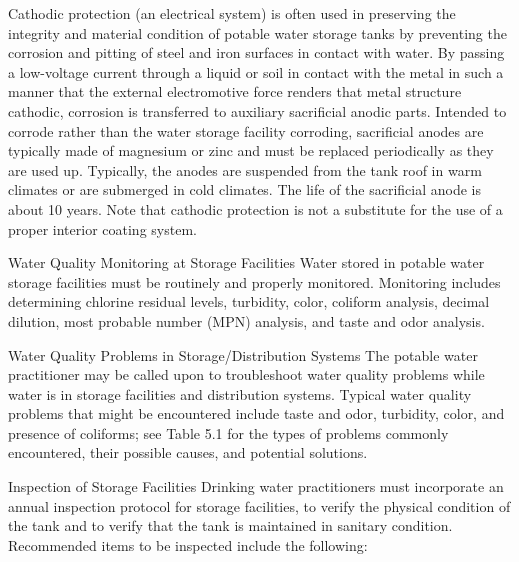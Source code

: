 \documentclass{article}
\begin{document}
Cathodic protection (an electrical system) is often used in preserving
the integrity and material condition of potable water storage tanks by
preventing the corrosion and pitting of steel and iron surfaces in
contact with water. By passing a low-voltage current through a liquid or
soil in contact with the metal in such a manner that the external
electromotive force renders that metal structure cathodic, corrosion is
transferred to auxiliary sacrificial anodic parts. Intended to corrode
rather than the water storage facility corroding, sacrificial anodes are
typically made of magnesium or zinc and must be replaced periodically as
they are used up. Typically, the anodes are suspended from the tank roof
in warm climates or are submerged in cold climates. The life of the
sacrificial anode is about 10 years. Note that cathodic protection is
not a substitute for the use of a proper interior coating system.

Water Quality Monitoring at Storage Facilities Water stored in potable
water storage facilities must be routinely and properly monitored.
Monitoring includes determining chlorine residual levels, turbidity,
color, coliform analysis, decimal dilution, most probable number (MPN)
analysis, and taste and odor analysis.

Water Quality Problems in Storage/Distribution Systems The potable water
practitioner may be called upon to troubleshoot water quality problems
while water is in storage facilities and distribution systems. Typical
water quality problems that might be encountered include taste and odor,
turbidity, color, and presence of coliforms; see Table 5.1 for the types
of problems commonly encountered, their possible causes, and potential
solutions.

Inspection of Storage Facilities Drinking water practitioners must
incorporate an annual inspection protocol for storage facilities, to
verify the physical condition of the tank and to verify that the tank is
maintained in sanitary condition. Recommended items to be inspected
include the following:
\end{document}
